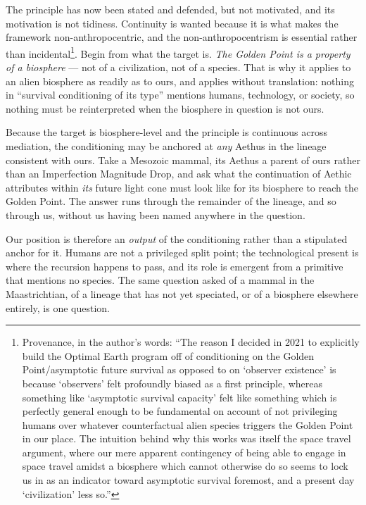 The principle has now been stated and defended, but not motivated, and
its motivation is not tidiness. Continuity is wanted because it is what
makes the framework non-anthropocentric, and the non-anthropocentrism is essential rather than incidental\footnote{Provenance, in the author's words: ``The reason I decided in 2021
to explicitly build the Optimal Earth program off of conditioning on the
Golden Point/asymptotic future survival as opposed to on `observer
existence' is because `observers' felt profoundly biased as a first
principle, whereas something like `asymptotic survival capacity' felt
like something which is perfectly general enough to be fundamental on
account of not privileging humans over whatever counterfactual alien
species triggers the Golden Point in our place. The intuition behind why
this works was itself the space travel argument, where our mere apparent
contingency of being able to engage in space travel amidst a biosphere
which cannot otherwise do so seems to lock us in as an indicator toward
asymptotic survival foremost, and a present day `civilization' less
so.''}. Begin from what the target is. \emph{The Golden Point is a property of a
biosphere} --- not of a civilization, not of a species. That is why it
applies to an alien biosphere as readily as to ours, and applies without
translation: nothing in ``survival conditioning of its type'' mentions
humans, technology, or society, so nothing must be reinterpreted when
the biosphere in question is not ours.

\begin{proposition}
\label{gc:prop:recursive}
Because the target is biosphere-level and the principle is continuous
across mediation, the conditioning may be anchored at \emph{any} Aethus
in the lineage consistent with ours. Take a Mesozoic mammal, its Aethus
a parent of ours rather than an Imperfection Magnitude Drop, and ask
what the continuation of Aethic attributes within \emph{its} future
light cone must look like for its biosphere to reach the Golden Point.
The answer runs through the remainder of the lineage, and so through
us, without us having been named anywhere in the question.
\end{proposition}

\noindent Our position is therefore an \emph{output} of the conditioning
rather than a stipulated anchor for it. Humans are not a privileged
split point; the technological present is where the recursion happens to
pass, and its role is emergent from a primitive that mentions no
species. The same question asked of a mammal in the Maastrichtian, of a
lineage that has not yet speciated, or of a biosphere elsewhere entirely,
is one question.


